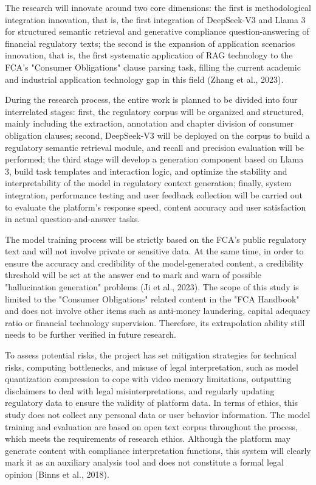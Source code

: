 \documentclass[a4paper,11pt]{article}
\begin{document}
The research will innovate around two core dimensions: the first is methodological integration innovation, that is, the first integration of DeepSeek-V3 and Llama 3 for structured semantic retrieval and generative compliance question-answering of financial regulatory texts; the second is the expansion of application scenarios innovation, that is, the first systematic application of RAG technology to the FCA's "Consumer Obligations" clause parsing task, filling the current academic and industrial application technology gap in this field (Zhang et al., 2023).

During the research process, the entire work is planned to be divided into four interrelated stages: first, the regulatory corpus will be organized and structured, mainly including the extraction, annotation and chapter division of consumer obligation clauses; second, DeepSeek-V3 will be deployed on the corpus to build a regulatory semantic retrieval module, and recall and precision evaluation will be performed; the third stage will develop a generation component based on Llama 3, build task templates and interaction logic, and optimize the stability and interpretability of the model in regulatory context generation; finally, system integration, performance testing and user feedback collection will be carried out to evaluate the platform's response speed, content accuracy and user satisfaction in actual question-and-answer tasks.

The model training process will be strictly based on the FCA's public regulatory text and will not involve private or sensitive data. At the same time, in order to ensure the accuracy and credibility of the model-generated content, a credibility threshold will be set at the answer end to mark and warn of possible "hallucination generation" problems (Ji et al., 2023). The scope of this study is limited to the "Consumer Obligations" related content in the "FCA Handbook" and does not involve other items such as anti-money laundering, capital adequacy ratio or financial technology supervision. Therefore, its extrapolation ability still needs to be further verified in future research.

To assess potential risks, the project has set mitigation strategies for technical risks, computing bottlenecks, and misuse of legal interpretation, such as model quantization compression to cope with video memory limitations, outputting disclaimers to deal with legal misinterpretations, and regularly updating regulatory data to ensure the validity of platform data. In terms of ethics, this study does not collect any personal data or user behavior information. The model training and evaluation are based on open text corpus throughout the process, which meets the requirements of research ethics. Although the platform may generate content with compliance interpretation functions, this system will clearly mark it as an auxiliary analysis tool and does not constitute a formal legal opinion (Binns et al., 2018).
\end{document}
